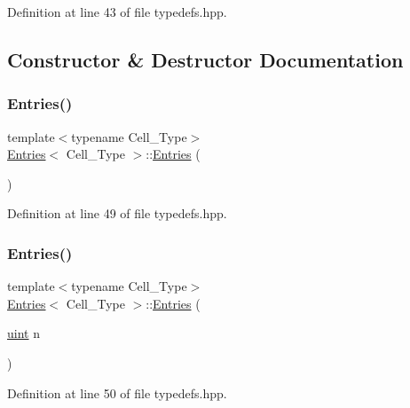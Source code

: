 Definition at line 43 of file typedefs.\+hpp.



\subsection{Constructor \& Destructor Documentation}
\mbox{\label{class_entries_a9e6cba5965f285beb3c0356c79f592d2}} 
\subsubsection{\texorpdfstring{Entries()}{Entries()}\hspace{0.1cm}{\footnotesize\ttfamily [1/2]}}
{\footnotesize\ttfamily template$<$typename Cell\+\_\+\+Type$>$ \\
\hyperlink{class_entries}{Entries}$<$ Cell\+\_\+\+Type $>$\+::\hyperlink{class_entries}{Entries} (\begin{DoxyParamCaption}{ }\end{DoxyParamCaption})\hspace{0.3cm}{\ttfamily [inline]}}



Definition at line 49 of file typedefs.\+hpp.

\mbox{\label{class_entries_a03249234a765e3363ae89dba76b3ff9f}} 
\subsubsection{\texorpdfstring{Entries()}{Entries()}\hspace{0.1cm}{\footnotesize\ttfamily [2/2]}}
{\footnotesize\ttfamily template$<$typename Cell\+\_\+\+Type$>$ \\
\hyperlink{class_entries}{Entries}$<$ Cell\+\_\+\+Type $>$\+::\hyperlink{class_entries}{Entries} (\begin{DoxyParamCaption}\item[{\hyperlink{typedefs_8hpp_a91ad9478d81a7aaf2593e8d9c3d06a14}{uint}}]{n }\end{DoxyParamCaption})\hspace{0.3cm}{\ttfamily [inline]}}



Definition at line 50 of file typedefs.\+hpp.

